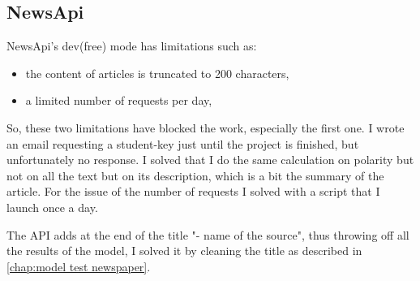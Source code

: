 \subsection{NewsApi}
NewsApi's dev(free) mode has limitations such as:
\begin{itemize}
    \item the content of articles is truncated to 200 characters,
    \item a limited number of requests per day,
\end{itemize}
So, these two limitations have blocked the work, especially the first one.
I wrote an email requesting a student-key just until the project is finished, but unfortunately no response.
I solved that I do the same calculation on polarity but not on all the text but on its description, which is a bit the summary of the article.
For the issue of the number of requests I solved with a script that I launch once a day.

The API adds at the end of the title "- name of the source", thus throwing off all the results of the model, I solved it by cleaning the title as described in \autoref{chap:model test newspaper}.